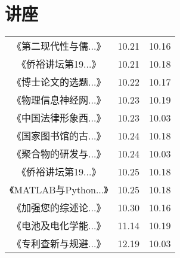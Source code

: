 \section{讲座}
\begin{tabular}{|c|c|c|}
    \hline《第二现代性与儒...》 & 10.21 & 10.16 \\
《侨裕讲坛第19...》 & 10.21 & 10.18 \\
《博士论文的选题...》 & 10.22 & 10.17 \\
《物理信息神经网...》 & 10.23 & 10.19 \\
《中国法律形象西...》 & 10.23 & 10.03 \\
《国家图书馆的古...》 & 10.24 & 10.18 \\
《聚合物的研发与...》 & 10.24 & 10.03 \\
《侨裕讲坛第19...》 & 10.25 & 10.18 \\
《MATLAB与Python...》 & 10.25 & 10.18 \\
《加强您的综述论...》 & 10.30 & 10.16 \\
《电池及电化学能...》 & 11.14 & 10.19 \\
《专利查新与规避...》 & 12.19 & 10.03 \\
    \hline\hline
    \hline
\end{tabular}